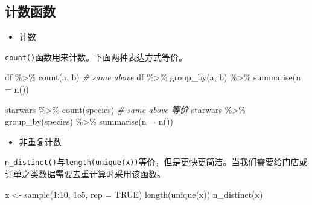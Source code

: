 \documentclass[
]{book}
\newenvironment{Shaded}{\begin{snugshade}}{\end{snugshade}}
\newcommand{\AttributeTok}[1]{\textcolor[rgb]{0.77,0.63,0.00}{#1}}
\newcommand{\CommentTok}[1]{\textcolor[rgb]{0.56,0.35,0.01}{\textit{#1}}}
\newcommand{\ConstantTok}[1]{\textcolor[rgb]{0.00,0.00,0.00}{#1}}
\newcommand{\DecValTok}[1]{\textcolor[rgb]{0.00,0.00,0.81}{#1}}
\newcommand{\FloatTok}[1]{\textcolor[rgb]{0.00,0.00,0.81}{#1}}
\newcommand{\FunctionTok}[1]{\textcolor[rgb]{0.00,0.00,0.00}{#1}}
\newcommand{\NormalTok}[1]{#1}
\newcommand{\OtherTok}[1]{\textcolor[rgb]{0.56,0.35,0.01}{#1}}
\newcommand{\SpecialCharTok}[1]{\textcolor[rgb]{0.00,0.00,0.00}{#1}}
\providecommand{\tightlist}{%
  \setlength{\itemsep}{0pt}\setlength{\parskip}{0pt}}
\begin{document}
\hypertarget{ux8ba1ux6570ux51fdux6570}{%
\subsection{计数函数}\label{ux8ba1ux6570ux51fdux6570}}

\begin{itemize}
\tightlist
\item
  计数
\end{itemize}

\texttt{count()}函数用来计数。下面两种表达方式等价。

\begin{Shaded}
\begin{Highlighting}[]
\NormalTok{df }\SpecialCharTok{\%\textgreater{}\%} \FunctionTok{count}\NormalTok{(a, b)}
\CommentTok{\# same above}
\NormalTok{df }\SpecialCharTok{\%\textgreater{}\%} \FunctionTok{group\_by}\NormalTok{(a, b) }\SpecialCharTok{\%\textgreater{}\%} \FunctionTok{summarise}\NormalTok{(}\AttributeTok{n =} \FunctionTok{n}\NormalTok{())}
\end{Highlighting}
\end{Shaded}

\begin{Shaded}
\begin{Highlighting}[]
\NormalTok{starwars }\SpecialCharTok{\%\textgreater{}\%} \FunctionTok{count}\NormalTok{(species)}
\CommentTok{\# same above 等价}
\NormalTok{starwars }\SpecialCharTok{\%\textgreater{}\%} \FunctionTok{group\_by}\NormalTok{(species) }\SpecialCharTok{\%\textgreater{}\%} \FunctionTok{summarise}\NormalTok{(}\AttributeTok{n =} \FunctionTok{n}\NormalTok{())}
\end{Highlighting}
\end{Shaded}

\begin{itemize}
\tightlist
\item
  非重复计数
\end{itemize}

\texttt{n\_distinct()}与\texttt{length(unique(x))}等价，但是更快更简洁。当我们需要给门店或订单之类数据需要去重计算时采用该函数。

\begin{Shaded}
\begin{Highlighting}[]
\NormalTok{x }\OtherTok{\textless{}{-}} \FunctionTok{sample}\NormalTok{(}\DecValTok{1}\SpecialCharTok{:}\DecValTok{10}\NormalTok{, }\FloatTok{1e5}\NormalTok{, }\AttributeTok{rep =} \ConstantTok{TRUE}\NormalTok{)}
\FunctionTok{length}\NormalTok{(}\FunctionTok{unique}\NormalTok{(x))}
\FunctionTok{n\_distinct}\NormalTok{(x)}
\end{Highlighting}
\end{Shaded}
\end{document}
